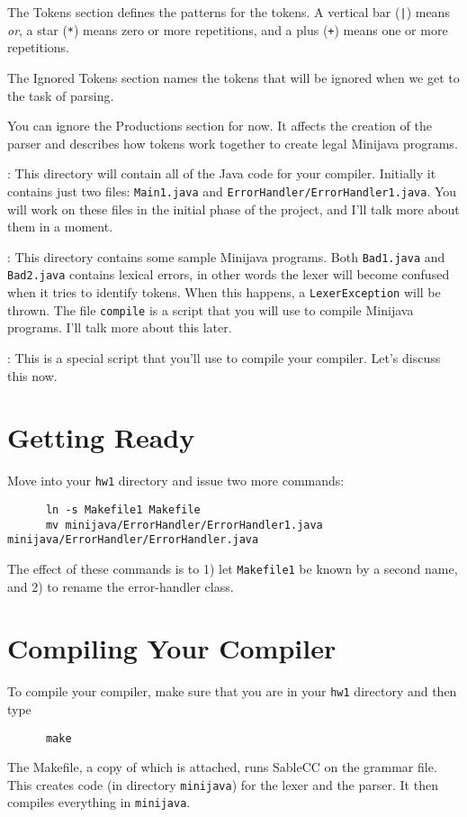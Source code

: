 \documentclass[11pt]{article}
\begin{document}
The Tokens section defines the patterns for the tokens.  A vertical
bar (\verb'|') means {\em or}, a star (\verb'*') means zero or more repetitions, and a
plus (\verb'+') means one or more repetitions.

The Ignored Tokens section names the tokens that will be ignored when
we get to the task of parsing.

You can ignore the Productions section for now.  It affects the creation of the parser and 
describes how tokens work together to create legal Minijava programs.

\mbox{}\par{}:  This directory will contain all of the Java code for your compiler.  Initially it contains just two files: {\tt Main1.java} and {\tt ErrorHandler/ErrorHandler1.java}.  You will work on these files in the initial phase of the project, and I'll talk more about them in a moment.

\mbox{}\par{}:  This directory contains some sample Minijava programs.  Both {\tt Bad1.java} and {\tt Bad2.java} contains lexical errors, in other words the lexer will become confused when it tries to identify tokens.  When this happens, a {\tt LexerException} will be thrown.  The file {\tt compile} is a script that you will use to compile Minijava programs.  I'll talk more about this later.

\mbox{}\par{}:  This is a special script that you'll use to compile your compiler.  Let's discuss this now.


\section{Getting Ready}
Move into your \verb'hw1' directory and issue two more commands:
\begin{verbatim}
      ln -s Makefile1 Makefile
      mv minijava/ErrorHandler/ErrorHandler1.java minijava/ErrorHandler/ErrorHandler.java
\end{verbatim}
The effect of these commands is to 1) let \verb'Makefile1' be known by a second name, and 2) to rename the error-handler class.

\section{Compiling Your Compiler}

To compile your compiler, make sure that you are in your {\tt hw1} directory and then type
\begin{verbatim}
      make
\end{verbatim}
The Makefile, a copy of which is attached, runs SableCC on the grammar file.  This creates code (in directory {\tt minijava}) for the lexer and the parser.  It then compiles everything in {\tt minijava}.
\end{document}

